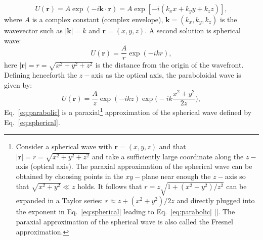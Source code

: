 \begin{refsection}
\begin{equation}\label{eq:planewave}
    U(\textbf{r}) = A\exp(-i\textbf{k}\cdot\textbf{r})=A\exp[-i(k_xx+k_yy+k_zz)],
\end{equation}
where $A$ is a complex constant (complex envelope), $\textbf{k}=(k_x, k_y, k_z)$ is the wavevector such as $\vert\textbf{k}\vert=k$ and $\textbf{r}=(x,y,z)$. A second solution is spherical wave:
\begin{equation}\label{eq:spherical}
    U(\textbf{r}) = \frac{A}{r}\exp(-ikr),
\end{equation}
here  $\vert\textbf{r}\vert=r=\sqrt{x^2 + y^2 +z^2}$ is the distance from the origin of the wavefront. %
Defining henceforth the $z-$axis as the optical axis, the paraboloidal wave is given by:
\begin{equation}\label{eq:parabolic}
    U(\textbf{r}) = \frac{A}{z}\exp(-ikz)\exp{\Bigg(-ik\frac{x^2 + y^2}{2z}\Bigg)},
\end{equation}
Eq.~\ref{eq:parabolic} is a paraxial\footnote{Consider a spherical wave with $\textbf{r}=(x,y,z)$ and that $\vert\textbf{r}\vert=r=\sqrt{x^2 + y^2 +z^2}$ and take a sufficiently large coordinate along the $z-$axis (optical axis). The paraxial approximation of the spherical wave can be obtained by choosing points in the $xy-$plane near enough the $z-$axis so that $\sqrt{x^2+y^2}\ll z$ holds. It follows that $r=z\sqrt{1+(x^2+y^2)/z^2}$ can be expanded in a Taylor series: $r\approx z+(x^2+y^2)/2z$ and directly plugged into the exponent in Eq.~\ref{eq:spherical} leading to Eq.~\ref{eq:parabolic} [\cite[\textit{§2.2}]{Saleh2019}]. The paraxial approximation of the spherical wave is also called the Fresnel approximation.\label{note:fresnel}} approximation of the spherical wave defined by Eq.~\ref{eq:spherical}.


\end{refsection}
